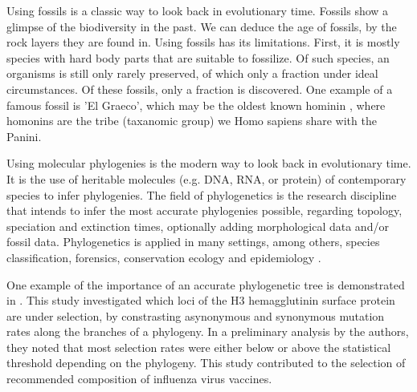 Using fossils is a classic way to look back in evolutionary time.
Fossils show a glimpse of the biodiversity in the past.
We can deduce the age of fossils, by the rock layers they are found in.
Using fossils has its limitations. First, it is mostly species with hard body
parts that are suitable to fossilize. Of such species, an organisms is still 
only rarely preserved, of which only a fraction under ideal circumstances. Of 
these fossils, only a fraction is discovered.
One example of a famous fossil is 'El Graeco', 
which may be the oldest known hominin \cite{fuss2017potential}, where
homonins are the tribe (taxanomic group) we Homo sapiens share with the Panini.


Using molecular phylogenies is the modern way to look back in evolutionary time.
It is the use of heritable molecules (e.g. DNA, RNA, or protein)  
of contemporary species to infer phylogenies. 
The field of phylogenetics is the research discipline that
intends to infer the most accurate phylogenies possible, 
regarding topology, speciation and extinction times,
optionally adding morphological data and/or fossil data.
Phylogenetics is applied in many settings, among
others, species classification,
forensics, conservation ecology
and epidemiology \cite{lam2010use}.


One example of the importance of an accurate phylogenetic tree 
is demonstrated in \cite{bush1999positive}. This study
investigated which loci of the H3 hemagglutinin surface protein
are under selection, by constrasting asynonymous and synonymous
mutation rates along the branches of a phylogeny. 
In a preliminary analysis by the authors, they noted that
most selection rates were either below or above the 
statistical threshold depending on the phylogeny.
This study contributed to the selection of recommended 
composition of influenza virus vaccines.


